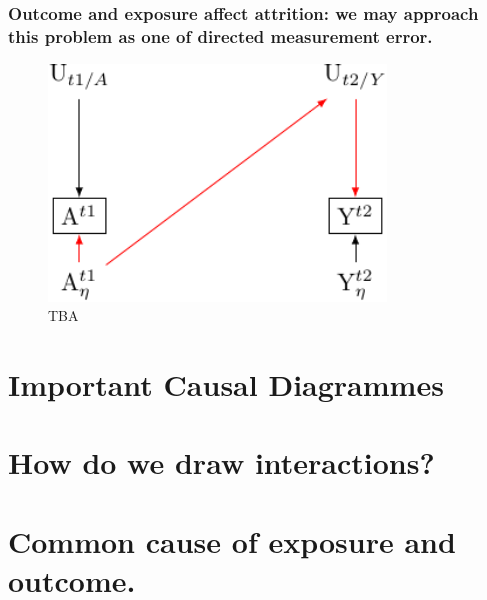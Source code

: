 \documentclass[
  singlecolumn]{report}
\begin{document}
\hypertarget{outcome-and-exposure-affect-attrition-we-may-approach-this-problem-as-one-of-directed-measurement-error.}{%
\subsubsection{Outcome and exposure affect attrition: we may approach
this problem as one of directed measurement
error.}\label{outcome-and-exposure-affect-attrition-we-may-approach-this-problem-as-one-of-directed-measurement-error.}}

\begin{figure}

{\centering \includegraphics[width=0.8\textwidth,height=\textheight]{causal-dags_files/figure-pdf/fig-directed-measurement-error-1.pdf}

}

\caption{\label{fig-directed-measurement-error}TBA}

\end{figure}

\hypertarget{important-causal-diagrammes}{%
\section{Important Causal
Diagrammes}\label{important-causal-diagrammes}}

\hypertarget{how-do-we-draw-interactions}{%
\section{How do we draw
interactions?}\label{how-do-we-draw-interactions}}

\hypertarget{common-cause-of-exposure-and-outcome.}{%
\section{Common cause of exposure and
outcome.}\label{common-cause-of-exposure-and-outcome.}}
\end{document}
